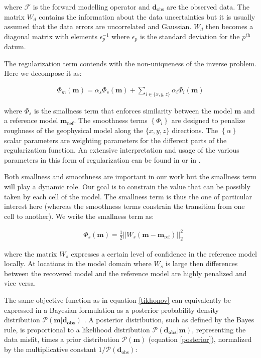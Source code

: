 \documentclass[extra]{gji} %
\begin{document}
where $\mathcal{F}$ is the forward modelling operator and $\mathbf{d}_{\text{obs}}$ are the observed data. The matrix $W_d$ contains the information about the data uncertainties but it is usually assumed that the data errors are uncorrelated and Gaussian. $W_d$ then becomes a diagonal matrix with elements $\epsilon_p^{-1}$ where $\epsilon_p$ is the standard deviation for the $p^{\text{th}}$ datum.

The regularization term contends with the non-uniqueness of the inverse problem. Here we decompose it as:

\begin{align}
\Phi_{m}(\mathbf{m})= \alpha_s \Phi_{s}(\mathbf{m}) + \sum_{i\in{\{x,y,z\}}}\alpha_i\Phi_{i}(\mathbf{m}) \label{regularizer}
\end{align}

where $\Phi_s$ is the smallness term that enforces similarity between the model $\mathbf{m}$ and a reference model $\mathbf{m_{\text{ref}}}$. The smoothness terms $\left\{\Phi_{i}\right\}$ are designed to penalize roughness of the geophysical model along the $\{{x,y,z}\}$ directions. The $\left\{\alpha\right\}$ scalar parameters are weighting parameters for the different parts of the regularization function. An extensive interpretation and usage of the various parameters in this form of regularization can be found in \cite{Lelievre2009} or in \cite{Williams_2008}.

Both smallness and smoothness are important in our work but the smallness term will play a dynamic role. Our goal is to constrain the value that can be possibly taken by each cell of the model. The smallness term is thus the one of particular interest here (whereas the smoothness terms constrain the transition from one cell to another). We write the smallness term as:

\begin{align}
&\Phi_s(\mathbf{m}) = \frac{1}{2}||W_{s}(\mathbf{m}-\mathbf{m}_{\text{ref}})||^2_2 \label{smallness_l2}
\end{align}

where the matrix $W_s$ expresses a certain level of confidence in the reference model locally. At locations in the model domain where $W_s$ is large then differences between the recovered model and the reference model are highly penalized and vice versa. %

The same objective function as in equation \ref{tikhonov} can equivalently be expressed in a Bayesian formulation as a posterior probability density distribution $\mathcal{P}(\mathbf{m}|\mathbf{d_{obs}})$ \citep{doi:10.1137/1.9780898717921}. A posterior distribution, such as defined by the Bayes rule, is proportional to a likelihood distribution $\mathcal{P}(\mathbf{d_{obs}}|\mathbf{m})$, representing the data misfit, times a prior distribution $\mathcal{P}(\mathbf{m})$ (equation \ref{posterior}), normalized by the multiplicative constant $1/\mathcal{P}(\mathbf{d}_{\text{obs}})$:
\end{document}
